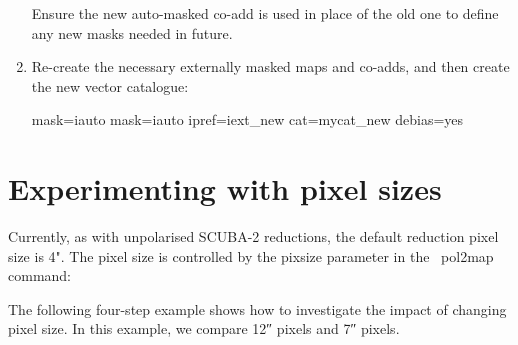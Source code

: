 \begin{enumerate}
  Ensure the new auto-masked co-add is used in place of the old one to
  define any new masks needed in future.

\begin{terminalv}
\end{terminalv}

\item Re-create the necessary externally masked maps and co-adds, and
  then create the new vector catalogue:

\begin{terminalv}
     mask=iauto
     mask=iauto ipref=iext_new cat=mycat_new debias=yes
\end{terminalv}
\end{enumerate}


\section{Experimenting with pixel sizes}

Currently, as with unpolarised SCUBA-2 reductions, the default
reduction pixel size is 4".  The pixel size is controlled by the
pixsize parameter in the \smurf\ pol2map command:

\begin{terminalv}
\end{terminalv}


The following four-step example shows how to investigate the impact of
changing pixel size.  In this example, we compare 12\si{\arcsecond}
pixels and 7\si{\arcsecond} pixels.

